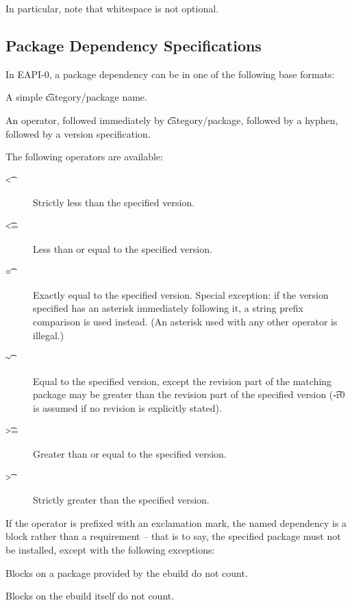 In particular, note that whitespace is not optional.

\subsection{Package Dependency Specifications}

In EAPI-0, a package dependency can be in one of the following base formats:

\begin{bulletlist}
\item A simple \t{category/package} name.
\item An operator, followed immediately by \t{category/package}, followed by a hyphen,
   followed by a version specification.
\end{bulletlist}


The following operators are available:

\begin{description}
\item[\t{<}] Strictly less than the specified version.
\item[\t{<=}] Less than or equal to the specified version.
\item[\t{=}] Exactly equal to the specified version. Special exception: if the version
    specified has an asterisk immediately following it, a string prefix comparison is
    used instead. (An asterisk used with any other operator is illegal.)
\item[\t{\~}] Equal to the specified version, except the revision part of the matching
    package may be greater than the revision part of the specified version (\t{-r0} is
    assumed if no revision is explicitly stated).
\item[\t{>=}] Greater than or equal to the specified version.
\item[\t{>}] Strictly greater than the specified version.
\end{description}

If the operator is prefixed with an exclamation mark, the named dependency is a block
rather than a requirement -- that is to say, the specified package must not be
installed, except with the following exceptions:

\begin{bulletlist}
\item Blocks on a package provided by the ebuild do not count.
\item Blocks on the ebuild itself do not count.
\end{bulletlist}

